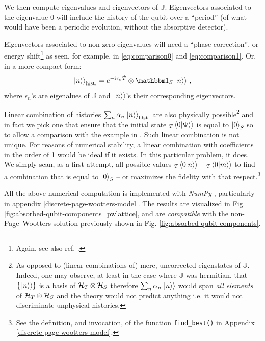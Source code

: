 We then compute eigenvalues and eigenvectors of $\mathbb{J}$.
Eigenvectors associated to the eigenvalue $0$ will include
the history of the qubit over a ``period''
(of what would have been a periodic evolution, without the absorptive detector).

Eigenvectors associated to non-zero eigenvalues will need a ``phase correction'',
or energy shift\footnote{ Again, see also ref. \cite[sec.``The Zero-eigenvalue'']{Lloyd:Time}. }
as seen, for example, in \eqref{eq:comparison0} and \eqref{eq:comparison1}.
Or, in a more compact form:
\begin{equation}
  \dket{n}_{\text{hist.}} = e^{-\iu \epsilon_n \hat{T}} \ox \idop_S \dket{n}
  \,\text{,}
\end{equation}
where $\epsilon_n$'s are eigenalues of $\mathbb{J}$ and
$\left.\left| n \right\rangle\right\rangle$'s their corresponding eigenvectors.

\citereset
Linear combination of histories $\sum_n \alpha_n \left.\left| n \right\rangle\right\rangle_{\text{hist.}}$
are also physically possible\footnote{
  As opposed to (linear combinations of) mere, uncorrected eigenstates of $\mathbb{J}$.
  Indeed, one may observe,
  at least in the case where $\mathbb{J}$ was hermitian,
  that $\left\{\left.\left| n \right\rangle\right\rangle\right\}$ is a basis
  of $\mathcal{H}_T \otimes \mathcal{H}_S$ therefore
  $\sum_n \alpha_n \left.\left| n \right\rangle\right\rangle$ would span \emph{all elements}
  of $\mathcal{H}_T \otimes \mathcal{H}_S$ and the theory would not predict anything i.e.
  it would not discriminate unphysical histories.
}
and in fact we pick
one that ensure that the initial state ${}_{T}\!\left.\left\langle 0 \middle| \Psi \right\rangle\right\rangle$ is equal to $\ket{0}_S$
so to allow a comparison with the example in \cite{RuschhauptAbsorption}.
Such linear combination is not unique. For reasons of numerical stability,
a linear combination with coefficients in the order of 1 would be ideal if it exists.
In this particular problem, it does.
We simply scan, as a first attempt, all possible values ${}_{T}\!\left.\left\langle 0 \middle| n \right\rangle\right\rangle + {}_{T}\!\left.\left\langle 0 \middle| m \right\rangle\right\rangle$
to find a combination that is equal to $\ket{0}_S$
-- or maximizes the fidelity with that respect.\footnote{
  See the definition, and invocation, of the function \texttt{find_best()} in Appendix \ref{discrete-page-wootters-model}.
}

All the above numerical computation is implemented with \emph{NumPy} \parencite{comp:numpy},
particularly in appendix
\ref{discrete-page-wootters-model}.
The results are visualized in
Fig. \ref{fig:absorbed-qubit-components_pwlattice},
and are \emph{compatible} with the non-Page--Wootters
solution previously shown in Fig. \ref{fig:absorbed-qubit-components}.

